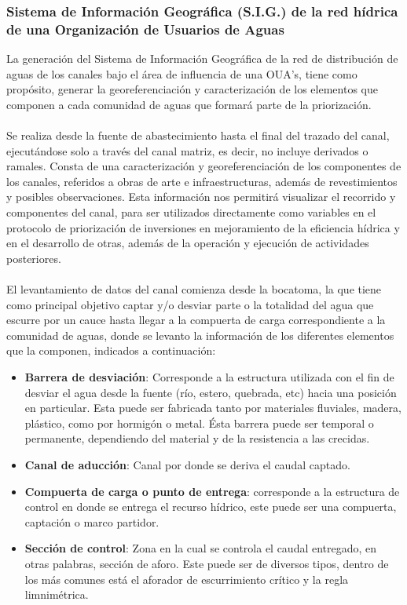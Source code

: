 \documentclass[]{article}
\begin{document}
\subsubsection{Sistema de Información Geográfica (S.I.G.) de la red hídrica de una Organización de Usuarios de Aguas}

La generación del Sistema de Información Geográfica de la red de distribución de aguas de los canales bajo el área de influencia de una OUA's, tiene como propósito, generar la georeferenciación y caracterización de los elementos que componen a cada comunidad de aguas que formará parte de la priorización.\\
\\
Se realiza desde la fuente de abastecimiento hasta el final del trazado del canal, ejecutándose solo a través del canal matriz, es decir, no incluye derivados o ramales. Consta de una caracterización y georeferenciación de los componentes de los canales, referidos a obras de arte e infraestructuras, además de revestimientos y posibles observaciones. Esta información nos permitirá visualizar el recorrido y componentes del canal, para ser utilizados directamente como variables en el protocolo de priorización de inversiones en mejoramiento de la eficiencia hídrica y en el desarrollo de otras, además de la operación y ejecución de actividades posteriores.\\
\\
El levantamiento de datos del canal comienza desde la bocatoma, la que tiene como principal objetivo captar y/o desviar parte o la totalidad del agua que escurre por un cauce hasta llegar a la compuerta de carga correspondiente a la comunidad de aguas, donde se levanto la información de los diferentes elementos que la componen, indicados a continuación:

\begin{itemize}
\item{\bfseries {Barrera de desviación}}: Corresponde a la estructura utilizada con el fin de desviar el agua desde la fuente (río, estero, quebrada, etc) hacia una posición en particular. Esta puede ser fabricada tanto por materiales fluviales, madera, plástico, como por hormigón o metal. Ésta barrera puede ser temporal o permanente, dependiendo del material y de la resistencia a las crecidas.
\item{\bfseries {Canal de aducción}}: Canal por donde se deriva el caudal captado.
\item{\bfseries {Compuerta de carga o punto de entrega}}: corresponde a la estructura de control en donde se entrega el recurso hídrico, este puede ser una compuerta, captación o marco partidor.
\item{\bfseries {Sección de control}}: Zona en la cual se controla el caudal entregado, en otras palabras, sección de aforo. Este puede ser de diversos tipos, dentro de los más comunes está el aforador de escurrimiento crítico y la regla limnimétrica.
\end{itemize}
\end{document}
